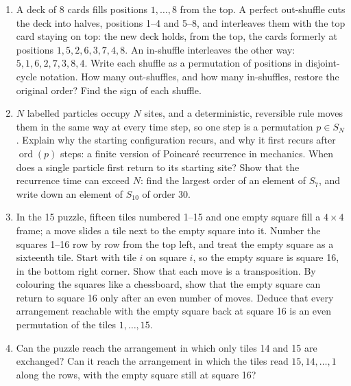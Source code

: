 \documentclass[11pt,a4paper]{article}
\DeclareMathOperator{\ord}{ord}
\newcommand{\problem}[1]{\par\vspace{0.9em}\noindent{\bfseries #1}\par\vspace{0.1em}}
\begin{document}
\problem{4. Shuffles, recurrence and the 15 puzzle}
\begin{enumerate}
  \item A deck of 8 cards fills positions $1, \dots, 8$ from the top. A perfect out-shuffle cuts the deck into halves, positions 1--4 and 5--8, and interleaves them with the top card staying on top: the new deck holds, from the top, the cards formerly at positions $1, 5, 2, 6, 3, 7, 4, 8$. An in-shuffle interleaves the other way: $5, 1, 6, 2, 7, 3, 8, 4$. Write each shuffle as a permutation of positions in disjoint-cycle notation. How many out-shuffles, and how many in-shuffles, restore the original order? Find the sign of each shuffle.
  \item $N$ labelled particles occupy $N$ sites, and a deterministic, reversible rule moves them in the same way at every time step, so one step is a permutation $p \in S_N$. Explain why the starting configuration recurs, and why it first recurs after $\ord(p)$ steps: a finite version of Poincaré recurrence in mechanics. When does a single particle first return to its starting site? Show that the recurrence time can exceed $N$: find the largest order of an element of $S_7$, and write down an element of $S_{10}$ of order 30.
  \item In the 15 puzzle, fifteen tiles numbered 1--15 and one empty square fill a $4 \times 4$ frame; a move slides a tile next to the empty square into it. Number the squares 1--16 row by row from the top left, and treat the empty square as a sixteenth tile. Start with tile $i$ on square $i$, so the empty square is square 16, in the bottom right corner. Show that each move is a transposition. By colouring the squares like a chessboard, show that the empty square can return to square 16 only after an even number of moves. Deduce that every arrangement reachable with the empty square back at square 16 is an even permutation of the tiles $1, \dots, 15$.
  \item Can the puzzle reach the arrangement in which only tiles 14 and 15 are exchanged? Can it reach the arrangement in which the tiles read $15, 14, \dots, 1$ along the rows, with the empty square still at square 16?
\end{enumerate}
\end{document}
